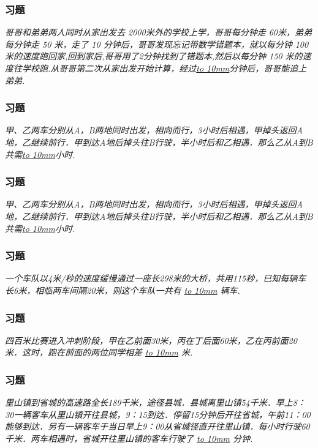 \begin{frame}
    \frametitle{习题\theframecounter}
    \vspace*{-3cm}
    \textit{哥哥和弟弟两人同时从家出发去 2000米外的学校上学，哥哥每分钟走 60米，弟弟每分钟走 50 米，走了 10 分钟后，哥哥发现忘记带数学错题本，就以每分钟 100 米的速度跑回家,回到家后,哥哥用了2分钟找到了错题本,然后以每分钟 150 米的速度往学校跑.从哥哥第二次从家出发开始计算，经过\underline{\hbox to 10mm{}}分钟后，哥哥能追上弟弟.}
\end{frame}

\begin{frame}
    \frametitle{习题\theframecounter}
    \vspace*{-3cm}
    \textit{甲、乙两车分别从A，B两地同时出发，相向而行，3小时后相遇，甲掉头返回A地，乙继续前行．甲到达A地后掉头往B行驶，半小时后和乙相遇．那么乙从A到B共需\underline{\hbox to 10mm{}}小时.}
\end{frame}


\begin{frame}
    \frametitle{习题\theframecounter}
    \vspace*{-3cm}
    \textit{甲、乙两车分别从A，B两地同时出发，相向而行，3小时后相遇，甲掉头返回A地，乙继续前行．甲到达A地后掉头往B行驶，半小时后和乙相遇．那么乙从A到B共需\underline{\hbox to 10mm{}}小时.}
\end{frame}

\begin{frame}
    \frametitle{习题\theframecounter}
    \vspace*{-3cm}
    \textit{一个车队以4米/秒的速度缓慢通过一座长298米的大桥，共用115秒，已知每辆车长6米，相临两车间隔20米，则这个车队一共有 \underline{\hbox to 10mm{}} 辆车.}
\end{frame}


\begin{frame}
    \frametitle{习题\theframecounter}
    \vspace*{-3cm}
    \textit{四百米比赛进入冲刺阶段，甲在乙前面30米，丙在丁后面60米，乙在丙前面20米．这时，跑在前面的两位同学相差 \underline{\hbox to 10mm{}} 米.}
\end{frame}

\begin{frame}
    \frametitle{习题\theframecounter}
    \vspace*{-3cm}
    \textit{里山镇到省城的高速路全长189千米，途径县城．县城离里山镇54千米．早上8：30一辆客车从里山镇开往县城，9：15到达．停留15分钟后开往省城，午前11：00能够到达．另有一辆客车于当日早上9：00从省城径直开往里山镇．每小时行驶60千米．两车相遇时，省城开往里山镇的客车行驶了 \underline{\hbox to 10mm{}} 分钟.}
\end{frame}


